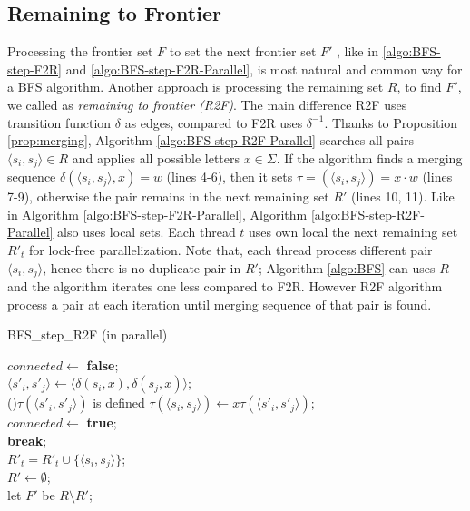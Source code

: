 \documentclass[12pt]{article}
\begin{document}
\subsection{Remaining to Frontier}
\label{sec:BFS-R2F-parallel}

Processing the frontier set $F$ to set the next frontier set $F'$ , like in \ref{algo:BFS-step-F2R} and \ref{algo:BFS-step-F2R-Parallel}, is most natural and common way for a BFS algorithm. Another approach is processing the remaining set $R$, to find $F'$, we called as \textit{remaining to frontier (R2F)}. The main difference R2F uses transition function $\delta$ as edges, compared to F2R uses $\delta^{-1}$. Thanks to Proposition \ref{prop:merging}, Algorithm \ref{algo:BFS-step-R2F-Parallel} searches all pairs $\langle s_i,s_j\rangle \in R$ and applies all possible letters $x \in \Sigma$. If the algorithm finds a merging sequence $\delta(\langle s_i,s_j\rangle, x) = w$ (lines 4-6), then it sets $\tau = (\langle s_i,s_j\rangle) = x \cdot w$ (lines 7-9), otherwise the pair remains in the next remaining set $R'$ (lines 10, 11). Like in Algorithm \ref{algo:BFS-step-F2R-Parallel}, Algorithm \ref{algo:BFS-step-R2F-Parallel} also uses local sets. Each thread $t$ uses own local the next remaining set $R'_t$ for lock-free parallelization. Note that, each thread process different pair $\langle s_i,s_j\rangle$, hence there is no duplicate pair in $R'$; Algorithm \ref{algo:BFS} can uses $R$ and the algorithm iterates one less compared to F2R. However R2F algorithm process a pair at each iteration until merging sequence of that pair is found.

\begin{algorithm}[ht]
	\label{algo:BFS-step-R2F-Parallel}
	\caption{BFS\_step\_R2F (in parallel)}
	
	
		{
			$connected  \longleftarrow $ {\bf false};\\
			{
				$\langle s'_i, s'_j \rangle \longleftarrow \langle \delta(s_i,x),\delta(s_j,x) \rangle$; \\ 

				\If(){$\tau(\langle s'_i, s'_j\rangle)$ is defined}
				{
					$\tau(\langle s_i, s_j\rangle) \longleftarrow x \tau(\langle s'_i, s'_j\rangle)$;\\
					$connected  \longleftarrow $ {\bf true};\\
					{\bf break};\\
				}
			}
			{
					$R'_t = R'_t \cup \{ \langle s_i, s_j\rangle \} $;\\
			}
		}
		$R' \longleftarrow \emptyset$;\\
		let $F'$ be $R \setminus R'$;
\end{algorithm}
\end{document}

